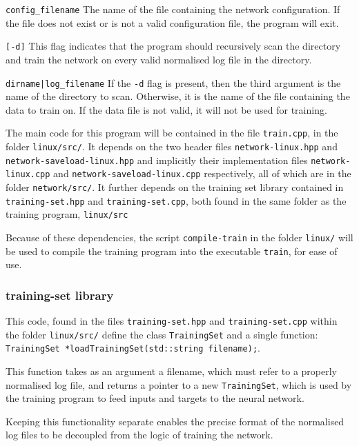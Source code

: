 \documentclass[a4paper]{article}
\begin{document}
\lstinline{config_filename} The name of the file containing the network configuration. If the file does not exist or is not a valid configuration file, the program will exit.

\lstinline{[-d]} This flag indicates that the program should recursively scan the directory and train the network on every valid normalised log file in the directory. 

\lstinline{dirname|log_filename} If the \lstinline{-d} flag is present, then the third argument is the name of the directory to scan. Otherwise, it is the name of the file containing the data to train on. If the data file is not valid, it will not be used for training.

The main code for this program will be contained in the file \lstinline{train.cpp}, in the folder \lstinline{linux/src/}. It depends on the two header files \lstinline{network-linux.hpp} and \lstinline{network-saveload-linux.hpp} and implicitly their implementation files \lstinline{network-linux.cpp} and \lstinline{network-saveload-linux.cpp} respectively, all of which are in the folder \lstinline{network/src/}. It further depends on the training set library contained in \lstinline{training-set.hpp} and \lstinline{training-set.cpp}, both found in the same folder as the training program, \lstinline{linux/src}

Because of these dependencies, the script \lstinline{compile-train} in the folder \lstinline{linux/} will be used to compile the training program into the executable \lstinline{train}, for ease of use.

\subsubsection{training-set library}

This code, found in the files \lstinline{training-set.hpp} and \lstinline{training-set.cpp} within the folder \lstinline{linux/src/} define the class \lstinline{TrainingSet} and a single function: \lstinline{TrainingSet *loadTrainingSet(std::string filename);}.

This function takes as an argument a filename, which must refer to a properly normalised log file, and returns a pointer to a new \lstinline{TrainingSet}, which is used by the training program to feed inputs and targets to the neural network.

Keeping this functionality separate enables the precise format of the normalised log files to be decoupled from the logic of training the network.
\end{document}
